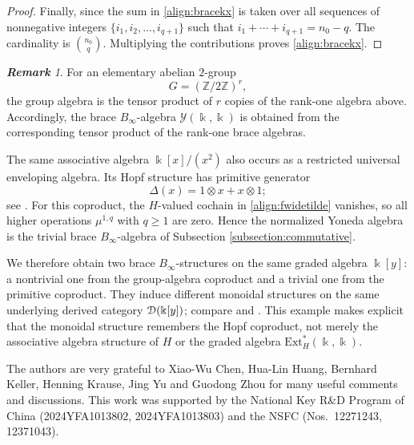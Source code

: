 \documentclass[a4paper, 11pt]{amsart}
\theoremstyle{definition}
\theoremstyle{remark}
\newtheorem{rem}[thm]{\bf Remark}
\numberwithin{equation}{section}
\newcommand{\Ext}{\mathrm{Ext}}
\newcommand{\Y}{\mathcal{Y}}
\newcommand{\ED}{\EuScript{D}}
\begin{document}
\begin{proof}
Finally, since the sum in \eqref{align:bracekx} is  taken over all sequences of nonnegative integers $\{i_1,i_2,\dotsc,i_{q+1}\}$  such that $i_1+\dotsb+i_{q+1}=n_0-q$.
The cardinality is $\binom{n_0}{q}$. Multiplying the contributions proves \eqref{align:bracekx}.
\end{proof}

\begin{rem}
For an elementary abelian $2$-group
\[
G=(\mathbb Z/2\mathbb Z)^r,
\]
the group algebra is the tensor product of $r$ copies of the rank-one algebra above. Accordingly, the brace $B_\infty$-algebra $\Y(\Bbbk,\Bbbk)$ is obtained from the corresponding tensor product of the rank-one brace algebras.

The same associative algebra $\Bbbk[x]/(x^2)$ also occurs as a restricted universal enveloping algebra. Its Hopf structure has primitive generator
\[
\Delta(x)=1\otimes x+x\otimes1;
\]
see \cite[Section 8]{BIK}. For this coproduct, the $H$-valued cochain in \eqref{align:fwidetilde} vanishes, so all higher operations $\mu^{1,q}$ with $q\geq1$ are zero. Hence the normalized Yoneda algebra is the trivial brace $B_\infty$-algebra of Subsection \ref{subsection:commutative}.

We therefore obtain two brace $B_\infty$-structures on the same graded algebra $\Bbbk[y]$: a nontrivial one from the group-algebra coproduct and a trivial one from the primitive coproduct. They induce different monoidal structures on the same underlying derived category $\ED(\Bbbk[y])$; compare \cite[Remark 14.3]{BeKr} and \cite[Theorem 3.6]{Hov11}. This example makes explicit that the monoidal structure remembers the Hopf coproduct, not merely the associative algebra structure of $H$ or the graded algebra $\Ext_H^*(\Bbbk,\Bbbk)$.
\end{rem}


\vskip 5pt

   The authors are very grateful to Xiao-Wu Chen, Hua-Lin Huang, Bernhard Keller, Henning Krause, Jing Yu and Guodong Zhou for many useful comments and discussions. This work was supported by the National Key R\&D Program of China (2024YFA1013802, 2024YFA1013803) and the NSFC (Nos.~12271243, 12371043).  
\vskip 5pt
\end{document}
